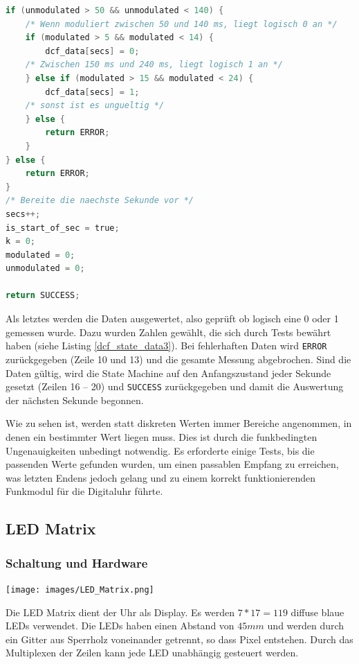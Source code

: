 %
\begin{lstlisting}[language=C,label=dcf_state_data3,caption=Empfang des DCF77 Signals - Messung auswerten]
if (unmodulated > 50 && unmodulated < 140) {
    /* Wenn moduliert zwischen 50 und 140 ms, liegt logisch 0 an */
    if (modulated > 5 && modulated < 14) {
        dcf_data[secs] = 0;
    /* Zwischen 150 ms und 240 ms, liegt logisch 1 an */
    } else if (modulated > 15 && modulated < 24) {
        dcf_data[secs] = 1;
    /* sonst ist es ungueltig */
    } else {
        return ERROR;
    }
} else {
    return ERROR;
}
/* Bereite die naechste Sekunde vor */
secs++;
is_start_of_sec = true;
k = 0;
modulated = 0;
unmodulated = 0;

return SUCCESS;
\end{lstlisting}
%
Als letztes werden die Daten ausgewertet, also geprüft ob logisch eine 0 oder 1 gemessen wurde. Dazu wurden Zahlen gewählt, die sich durch Tests bewährt haben (siehe Listing \ref{dcf_state_data3}). Bei fehlerhaften Daten wird \texttt{ERROR} zurückgegeben (Zeile 10 und 13) und die gesamte Messung abgebrochen. Sind die Daten gültig, wird die State Machine auf den Anfangszustand jeder Sekunde gesetzt (Zeilen 16 -- 20) und \texttt{SUCCESS} zurückgegeben und damit die Auswertung der nächsten Sekunde begonnen.

Wie zu sehen ist, werden statt diskreten Werten immer Bereiche angenommen, in denen ein bestimmter Wert liegen muss. Dies ist durch die funkbedingten Ungenauigkeiten unbedingt notwendig. Es erforderte einige Tests, bis die passenden Werte gefunden wurden, um einen passablen Empfang zu erreichen, was letzten Endens jedoch gelang und zu einem korrekt funktionierenden Funkmodul für die Digitaluhr führte.
%
\subsection{LED Matrix}
\subsubsection{Schaltung und Hardware}
\begin{center}
	\texttt{[image: images/LED\_Matrix.png]}
\label{led_oben}
\end{center}
Die LED Matrix dient der Uhr als Display. Es werden $7*17=119$ diffuse blaue
LEDs verwendet. Die LEDs haben einen Abstand von $45 mm$ und werden durch ein Gitter aus Sperrholz voneinander getrennt, so dass
Pixel entstehen. Durch das Multiplexen der Zeilen kann jede LED unabhängig
gesteuert werden.

